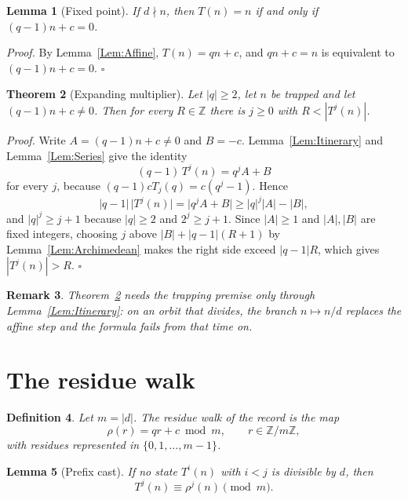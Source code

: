 \documentclass[11pt,letterpaper]{article}
\newcommand{\Z}{\mathbb{Z}}
\newtheorem{theorem}{Theorem}
\newtheorem{lemma}[theorem]{Lemma}
\newtheorem{definition}[theorem]{Definition}
\newtheorem{remark}[theorem]{Remark}
\newenvironment{proof}{\noindent\textit{Proof.}}{\hfill\(\square\)}
\begin{document}
\begin{lemma}[Fixed point]\label{Lem:Fixed}
If \(d\nmid n\), then \(T(n)=n\) if and only if \((q-1)n+c=0\).
\end{lemma}

\begin{proof}
By Lemma~\ref{Lem:Affine}, \(T(n)=qn+c\), and \(qn+c=n\) is equivalent to
\((q-1)n+c=0\).
\end{proof}

\begin{theorem}[Expanding multiplier]\label{Thm:Expanding}
Let \(|q|\ge2\), let \(n\) be trapped and let \((q-1)n+c\ne0\). Then for every
\(R\in\Z\) there is \(j\ge0\) with \(R<|T^{j}(n)|\).
\end{theorem}

\begin{proof}
Write \(A=(q-1)n+c\ne0\) and \(B=-c\). Lemma~\ref{Lem:Itinerary} and
Lemma~\ref{Lem:Series} give the identity
\[
(q-1)\,T^{j}(n)=q^{j}A+B
\]
for every \(j\), because \((q-1)cT_{j}(q)=c(q^{j}-1)\). Hence
\[
|q-1|\,\bigl|T^{j}(n)\bigr|=\bigl|q^{j}A+B\bigr|\ge|q|^{j}|A|-|B|,
\]
and \(|q|^{j}\ge j+1\) because \(|q|\ge2\) and \(2^{j}\ge j+1\). Since
\(|A|\ge1\) and \(|A|,|B|\) are fixed integers, choosing \(j\) above
\(|B|+|q-1|(R+1)\) by Lemma~\ref{Lem:Archimedean} makes the right side exceed
\(|q-1|R\), which gives \(|T^{j}(n)|>R\).
\end{proof}

\begin{remark}\label{Rem:NoDivisor}
Theorem~\ref{Thm:Expanding} needs the trapping premise only through
Lemma~\ref{Lem:Itinerary}: on an orbit that divides, the branch \(n\mapsto n/d\)
replaces the affine step and the formula fails from that time on.
\end{remark}

\section{The residue walk}\label{Sec:Residue}

\begin{definition}\label{Def:Residue}
Let \(m=|d|\). The residue walk of the record is the map
\[
\rho(r)=qr+c \bmod m,\qquad r\in\Z/m\Z ,
\]
with residues represented in \(\{0,1,\dots,m-1\}\).
\end{definition}

\begin{lemma}[Prefix cast]\label{Lem:PrefixCast}
If no state \(T^{i}(n)\) with \(i<j\) is divisible by \(d\), then
\[
T^{j}(n)\equiv \rho^{j}(n)\pmod m .
\]
\end{lemma}
\end{document}

